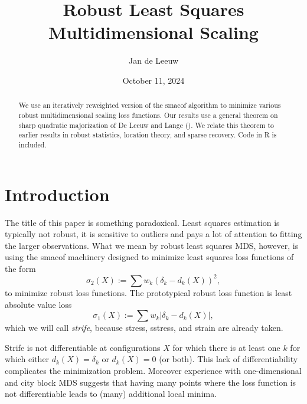 \documentclass[
  12pt,
  letterpaper,
  DIV=11,
  numbers=noendperiod]{scrartcl}
\title{Robust Least Squares Multidimensional Scaling}
\author{Jan de Leeuw}
\date{October 11, 2024}
\newcommand{\sectionbreak}{\pagebreak}
\renewcommand*\contentsname{Table of contents}
\newcommand\contentsname{Table of contents}
\theoremstyle{plain}
\theoremstyle{plain}
\theoremstyle{plain}
\theoremstyle{definition}
\theoremstyle{remark}
\begin{document}
\maketitle
\begin{abstract}
We use an iteratively reweighted version of the smacof algorithm to
minimize various robust multidimensional scaling loss functions. Our
results use a general theorem on sharp quadratic majorization of De
Leeuw and Lange (). We relate
this theorem to earlier results in robust statistics, location theory,
and sparse recovery. Code in R is included.
\end{abstract}

\renewcommand*\contentsname{Table of contents}
{
\hypersetup{linkcolor=}
\setcounter{tocdepth}{3}
\tableofcontents
}

\sectionbreak

\listoffigures

\sectionbreak

\section{Introduction}\label{introduction}

The title of this paper is something paradoxical. Least squares
estimation is typically not robust, it is sensitive to outliers and pays
a lot of attention to fitting the larger observations. What we mean by
robust least squares MDS, however, is using the smacof machinery
designed to minimize least squares loss functions of the form
\begin{equation}
\sigma_2(X):=\sum w_k(\delta_k-d_k(X))^2\label{eq:stressdef},
\end{equation} to minimize robust loss functions. The prototypical
robust loss function is least absolute value loss \begin{equation}
\sigma_1(X):=\sum w_k|\delta_k-d_k(X)|\label{eq:stradddef},
\end{equation} which we will call \emph{strife}, because stress,
sstress, and strain are already taken.

Strife is not differentiable at configurations \(X\) for which there is
at least one \(k\) for which either \(d_k(X)=\delta_k\) or \(d_k(X)=0\)
(or both). This lack of differentiability complicates the minimization
problem. Moreover experience with one-dimensional and city block MDS
suggests that having many points where the loss function is not
differentiable leads to (many) additional local minima.
\end{document}
